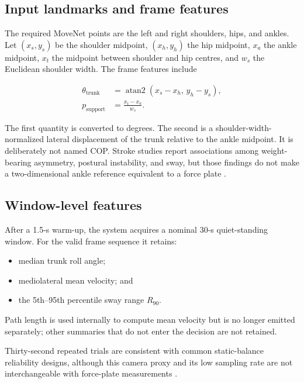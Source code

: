 \documentclass[11pt,a4paper]{article}
\begin{document}
\subsection{Input landmarks and frame features}

The required MoveNet points are the left and right shoulders, hips, and ankles. Let $(x_s,y_s)$ be the shoulder midpoint, $(x_h,y_h)$ the hip midpoint, $x_a$ the ankle midpoint, $x_t$ the midpoint between shoulder and hip centres, and $w_s$ the Euclidean shoulder width. The frame features include

\begin{align}
\theta_{\mathrm{trunk}} & = \operatorname{atan2}(x_s-x_h,\,y_h-y_s), \\
p_{\mathrm{support}} & = \frac{x_t-x_a}{w_s}.
\end{align}

The first quantity is converted to degrees. The second is a shoulder-width-normalized lateral displacement of the trunk relative to the ankle midpoint. It is deliberately not named COP. Stroke studies report associations among weight-bearing asymmetry, postural instability, and sway, but those findings do not make a two-dimensional ankle reference equivalent to a force plate \cite{kamphuis2013asymmetry,yeung2014kinect}.

\subsection{Window-level features}

After a 1.5-s warm-up, the system acquires a nominal 30-s quiet-standing window. For the valid frame sequence it retains:

\begin{itemize}
  \item median trunk roll angle;
  \item mediolateral mean velocity; and
  \item the 5th--95th percentile sway range $R_{90}$.
\end{itemize}

Path length is used internally to compute mean velocity but is no longer emitted
separately; other summaries that do not enter the decision are not retained.

Thirty-second repeated trials are consistent with common static-balance reliability designs, although this camera proxy and its low sampling rate are not interchangeable with force-plate measurements \cite{aryan2023forceplate,ruhe2010cop}.
\end{document}
